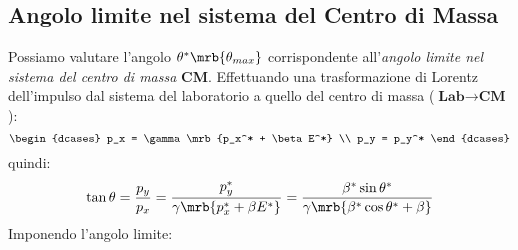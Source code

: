 \subsection{Angolo limite nel sistema del Centro di Massa}
Possiamo valutare l'angolo $\theta^*\mrb{\theta_{max}}$ corrispondente
all'\textit{angolo limite nel sistema del centro di massa} \textbf{CM}.
Effettuando una trasformazione di Lorentz dell'impulso dal sistema del
laboratorio a quello del centro di massa ($\textbf{Lab} \to \textbf{CM}$):
\begin{equation}
  \begin{dcases}
    p_x = \gamma \mrb{p_x^* + \beta E^*}
    \\
    p_y = p_y^*
  \end{dcases}
\end{equation}
quindi:
\begin{equation}
  \tan \theta = \frac{p_y}{p_x} = \frac{p_y^*}{\gamma \mrb{p_x^* + \beta E^*}}
  = \frac{\beta^* \sin \theta^*}{\gamma \mrb{\beta^* \cos \theta^* + \beta}}
\end{equation}
Imponendo l'angolo limite:
